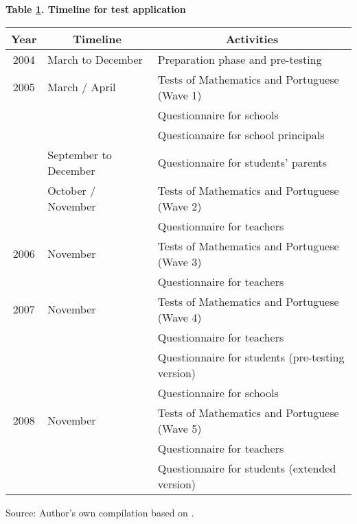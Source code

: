 \documentclass[a4paper, 12pt]{article}
\begin{document}
\begin{table}[H]
  \centering
            \label{table:ScheduleGERES}                        \centering            \textbf{Table \ref{table:ScheduleGERES}. Timeline for test application} \\ 
      \begin{tabular}{lll}
    \toprule
    \multicolumn{1}{c}{\textbf{Year}} & \multicolumn{1}{c}{\textbf{Timeline}} & \multicolumn{1}{c}{\textbf{Activities}} \\
    \midrule
    \multicolumn{1}{c}{2004} & March to December & Preparation phase and pre-testing \\
    \midrule
    \multicolumn{1}{c}{2005} & March / April & Tests of Mathematics and Portuguese (Wave 1) \\
          &       & Questionnaire for schools \\
          &       & Questionnaire for school principals \\
\cmidrule{2-3}          & September to December & Questionnaire for students' parents  \\
\cmidrule{2-3}          & October / November & Tests of Mathematics and Portuguese (Wave 2) \\
          &       & Questionnaire for teachers \\
    \midrule
    \multicolumn{1}{c}{2006} & November & Tests of Mathematics and Portuguese (Wave 3) \\
          &       & Questionnaire for teachers \\
    \midrule
    \multicolumn{1}{c}{2007} & November & Tests of Mathematics and Portuguese (Wave 4) \\
          &       & Questionnaire for teachers \\
          &       & Questionnaire for students (pre-testing version) \\
          &       & Questionnaire for schools \\
    \midrule
    \multicolumn{1}{c}{2008} & November & Tests of Mathematics and Portuguese (Wave 5) \\
          &       & Questionnaire for teachers \\
          &       & Questionnaire for students (extended version)  \\ 
    \bottomrule
     \end{tabular}%
     \end{table}%
     \vspace{-20pt} \hspace{-10pt}
    \begin{minipage}{1\textwidth} 
{\scriptsize
Source: Author's own compilation based on \citet{brooke2011geres}.\par}
\end{minipage}  
\end{document}
